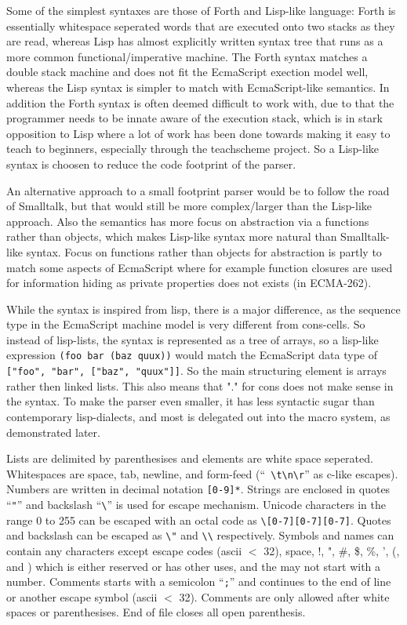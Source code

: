 Some of the simplest syntaxes are those of Forth and Lisp-like language: Forth is essentially whitespace seperated words that are executed onto two stacks as they are read, whereas Lisp has almost explicitly written syntax tree that runs as a more common functional/imperative machine.
The Forth syntax matches a double stack machine and does not fit the EcmaScript exection model well, whereas the Lisp syntax is simpler to match with EcmaScript-like semantics. 
In addition the Forth syntax is often deemed difficult to work with, due to that the programmer needs to be innate aware of the execution stack, which is in stark opposition to Lisp where a lot of work has been done towards making it easy to teach to beginners, especially through the teachscheme project\cite{teachscheme}.
So a Lisp-like syntax is choosen to reduce the code footprint of the parser.

An alternative approach to a small footprint parser would be to follow the road of Smalltalk,
but that would still be more complex/larger than the Lisp-like approach.
Also the semantics has more focus on abstraction via a functions rather than objects, which makes Lisp-like syntax more natural than Smalltalk-like syntax. 
Focus on functions rather than objects for abstraction is partly to match some aspects of EcmaScript where for example function closures are used for information hiding as private properties does not exists (in ECMA-262)\cite{javascriptoop}. 

While the syntax is inspired from lisp,
there is a major difference, as the sequence type
in the EcmaScript machine model is very different from cons-cells.
So instead of lisp-lists, the syntax is represented
as a tree of arrays, so a lisp-like expression
\verb|(foo bar (baz quux))|
would match the EcmaScript data type of \verb|["foo", "bar", ["baz", "quux"]]|.
So the main structuring element is arrays rather then linked lists.
This also means that "." for cons does not make sense in the syntax.
To make the parser even smaller, it has less syntactic sugar than contemporary lisp-dialects, and most is delegated out into the macro system, as demonstrated later.



Lists are delimited by parenthesises and elements are white space seperated.
Whitespaces are space, tab, newline, and form-feed (``\verb| \t\n\r|'' as c-like escapes).
Numbers are written in decimal notation \verb|[0-9]*|.
Strings are enclosed in quotes ``\verb|"|'' and backslash ``\verb|\|'' is used for escape mechanism. Unicode characters in the range 0 to 255 can be escaped with an octal code as \verb|\[0-7][0-7][0-7]|. Quotes and backslash can be escaped as \verb|\"| and \verb|\\| respectively. 
Symbols and names can contain any characters except escape codes (ascii $<$ 32), space, !, ", \#, \$, \%, ', (, and ) which is either reserved or has other uses, and the may not start with a number. 
Comments starts with a semicolon ``\verb|;|'' and continues to the end of line or another escape symbol (ascii $<$ 32). Comments are only allowed after white spaces or parenthesises.
End of file closes all open parenthesis.

